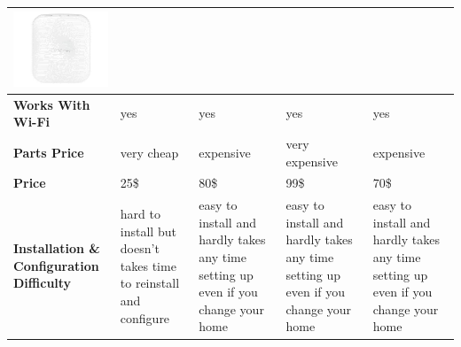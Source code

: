 \documentclass[12pt, oneside, a4paper]{book}
\newcommand\boldcolor[1]{\textcolor{bold}{\textbf{#1}}}
\begin{document}
\begin{table}[H]
\begin{center}
\begin{tabularx}{\linewidth}{|m{4cm}*4{|X}|}
						\includegraphics[width=\linewidth]{img/samsung_hw.png}
					 \\\hline
					\boldcolor{Works With Wi-Fi} & yes & yes & yes & yes  \\\hline


					
					\boldcolor{Parts Price} & very cheap & expensive & very expensive & expensive  \\\hline
					\boldcolor{Price} & 25\$ & 80\$ & 99\$ & 70\$ \\\hline
					
					\boldcolor{Installation \& Configuration Difficulty} & hard to install but doesn't takes time to reinstall and configure& easy to install and hardly takes any time setting up even if you change your home  & easy to install and hardly takes any time setting up even if you change your home  & easy to install and hardly takes any time setting up even if you change your home
					\\\hline
				\end{tabularx}
			\end{center}
		\end{table}
		\newpage	
\end{document}
